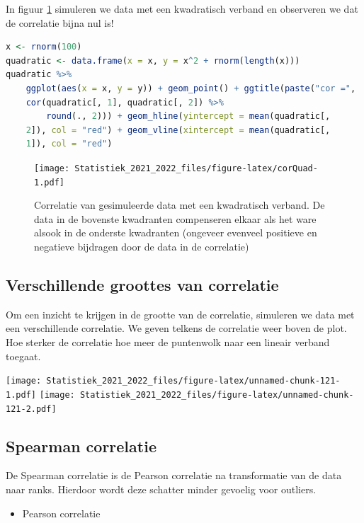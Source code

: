 \documentclass[
  12pt,dutch,coursenotes]{book}
\providecommand{\tightlist}{%
  \setlength{\itemsep}{0pt}\setlength{\parskip}{0pt}}
\theoremstyle{definition}
\theoremstyle{definition}
\theoremstyle{definition}
\theoremstyle{definition}
\theoremstyle{remark}
\begin{document}
In figuur \ref{fig:corQuad} simuleren we data met een kwadratisch verband en observeren we dat de correlatie bijna nul is!

\begin{lstlisting}[language=R]
x <- rnorm(100)
quadratic <- data.frame(x = x, y = x^2 + rnorm(length(x)))
quadratic %>%
    ggplot(aes(x = x, y = y)) + geom_point() + ggtitle(paste("cor =",
    cor(quadratic[, 1], quadratic[, 2]) %>%
        round(., 2))) + geom_hline(yintercept = mean(quadratic[,
    2]), col = "red") + geom_vline(xintercept = mean(quadratic[,
    1]), col = "red")
\end{lstlisting}

\begin{figure}
\centering
\texttt{[image: Statistiek\_2021\_2022\_files/figure-latex/corQuad-1.pdf]}
\caption{\label{fig:corQuad}Correlatie van gesimuleerde data met een kwadratisch verband. De data in de bovenste kwadranten compenseren elkaar als het ware alsook in de onderste kwadranten (ongeveer evenveel positieve en negatieve bijdragen door de data in de correlatie)}
\end{figure}

\hypertarget{verschillende-groottes-van-correlatie}{%
\subsection{Verschillende groottes van correlatie}\label{verschillende-groottes-van-correlatie}}

Om een inzicht te krijgen in de grootte van de correlatie, simuleren we data met een verschillende correlatie. We geven telkens de correlatie weer boven de plot. Hoe sterker de correlatie hoe meer de puntenwolk naar een lineair verband toegaat.

\texttt{[image: Statistiek\_2021\_2022\_files/figure-latex/unnamed-chunk-121-1.pdf]} \texttt{[image: Statistiek\_2021\_2022\_files/figure-latex/unnamed-chunk-121-2.pdf]}

\hypertarget{spearman-correlatie}{%
\subsection{Spearman correlatie}\label{spearman-correlatie}}

De Spearman correlatie is de Pearson correlatie na transformatie van de data naar ranks. Hierdoor wordt deze schatter minder gevoelig voor outliers.

\begin{itemize}
\tightlist
\item
  Pearson correlatie
\end{itemize}
\end{document}
